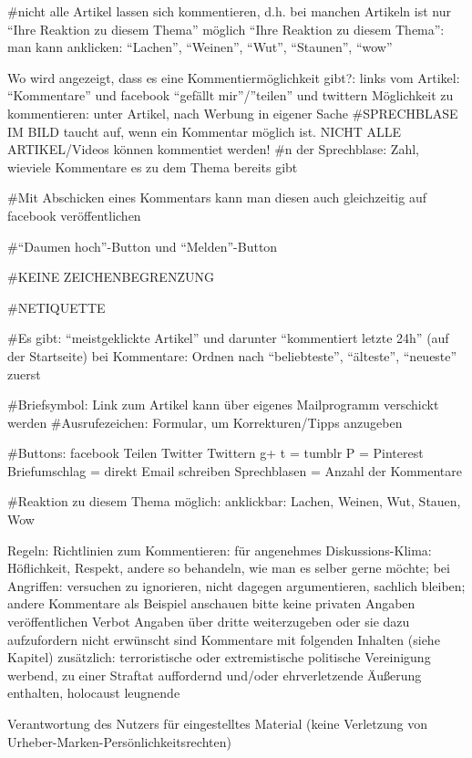 #nicht alle Artikel lassen sich kommentieren, d.h. bei manchen Artikeln ist nur ``Ihre Reaktion zu diesem Thema'' möglich 
``Ihre Reaktion zu diesem Thema'': man kann anklicken: ``Lachen'', ``Weinen'', ``Wut'', ``Staunen'', ``wow''


Wo wird angezeigt, dass es eine Kommentiermöglichkeit gibt?: links vom Artikel: ``Kommentare'' und facebook ``gefällt mir''/''teilen'' und twittern 
Möglichkeit zu kommentieren: unter Artikel, nach Werbung in eigener Sache
#SPRECHBLASE IM BILD taucht auf, wenn ein Kommentar möglich ist. NICHT ALLE ARTIKEL/Videos können kommentiet werden! 
#n der Sprechblase: Zahl, wieviele Kommentare es zu dem Thema bereits gibt

#Mit Abschicken eines Kommentars kann man diesen auch gleichzeitig auf facebook veröffentlichen

#``Daumen hoch''-Button und ``Melden''-Button


#KEINE ZEICHENBEGRENZUNG

#NETIQUETTE

#Es gibt: ``meistgeklickte Artikel'' und darunter ``kommentiert letzte 24h'' (auf der Startseite)
bei Kommentare: Ordnen nach ``beliebteste'', ``älteste'', ``neueste'' zuerst

#Briefsymbol: Link zum Artikel kann über eigenes Mailprogramm verschickt werden
#Ausrufezeichen: Formular, um Korrekturen/Tipps anzugeben

#Buttons:
facebook Teilen
Twitter Twittern
g+
t = tumblr
P = Pinterest
Briefumschlag = direkt Email schreiben
Sprechblasen = Anzahl der Kommentare


#Reaktion zu diesem Thema möglich: anklickbar: Lachen, Weinen, Wut, Stauen, Wow


Regeln: Richtlinien zum Kommentieren:
	für angenehmes Diskussions-Klima: Höflichkeit, Respekt, andere so behandeln, wie man es selber gerne möchte; bei Angriffen: versuchen zu ignorieren, nicht 			dagegen argumentieren, sachlich bleiben; andere Kommentare als Beispiel anschauen
	bitte keine privaten Angaben veröffentlichen
	Verbot Angaben über dritte weiterzugeben oder sie dazu aufzufordern
	nicht erwünscht sind Kommentare mit folgenden Inhalten (siehe Kapitel)
	zusätzlich: terroristische oder extremistische politische Vereinigung werbend, zu einer Straftat auffordernd und/oder ehrverletzende Äußerung enthalten, holocaust leugnende


	Verantwortung des Nutzers für eingestelltes Material (keine Verletzung von Urheber-Marken-Persönlichkeitsrechten)

